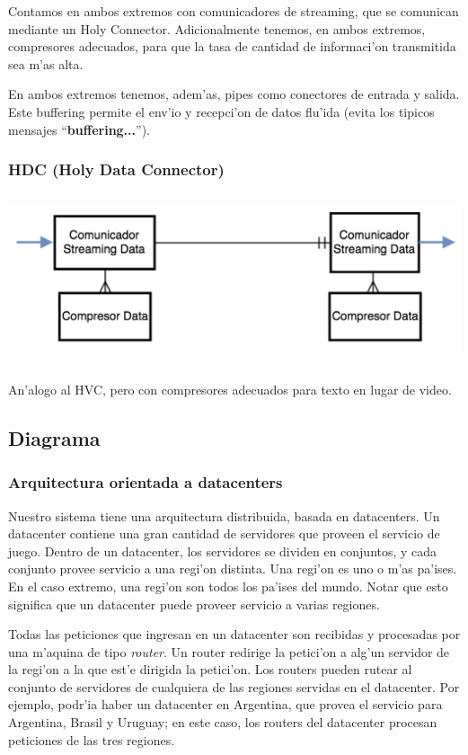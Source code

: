 Contamos en ambos extremos con comunicadores de streaming, que se comunican mediante un Holy Connector. Adicionalmente tenemos, en ambos extremos, compresores adecuados, para que la tasa de cantidad de informaci'on transmitida sea m'as alta.

En ambos extremos tenemos, adem'as, pipes como conectores de entrada y salida. Este buffering permite el env'io y recepci'on de datos flu'ida (evita los tipicos mensajes ``\textbf{buffering...}'').


\subsubsection{HDC (Holy Data Connector)}

\includegraphics[height=5cm]{diagramas/HDC} 

An'alogo al HVC, pero con compresores adecuados para texto en lugar de video. 

\subsection{Diagrama}

\subsubsection{Arquitectura orientada a datacenters}

Nuestro sistema tiene una arquitectura distribuida, basada en datacenters. Un datacenter contiene una gran cantidad de servidores que proveen el servicio de juego. Dentro de un datacenter, los servidores se dividen en conjuntos, y cada conjunto provee servicio a una regi'on distinta. Una regi'on es uno o m'as pa'ises. En el caso extremo, una regi'on son todos los pa'ises del mundo. Notar que esto significa que un datacenter puede proveer servicio a varias regiones.

Todas las peticiones que ingresan en un datacenter son recibidas y procesadas por una m'aquina de tipo \textit{router}. Un router redirige la petici'on a alg'un servidor de la regi'on a la que est'e dirigida la petici'on. Los routers pueden rutear al conjunto de servidores de cualquiera de las regiones servidas en el datacenter. Por ejemplo, podr'ia haber un datacenter en Argentina, que provea el servicio para Argentina, Brasil y Uruguay; en este caso, los routers del datacenter procesan peticiones de las tres regiones.

